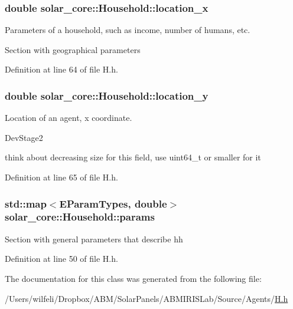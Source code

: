 \subsubsection[{location\+\_\+x}]{\setlength{\rightskip}{0pt plus 5cm}double solar\+\_\+core\+::\+Household\+::location\+\_\+x\hspace{0.3cm}{\ttfamily [protected]}}\label{classsolar__core_1_1_household_a6596375631a366fdd24270f75548841f}
Parameters of a household, such as income, number of humans, etc.

Section with geographical parameters 

Definition at line 64 of file H.\+h.

\hypertarget{classsolar__core_1_1_household_a1ba6b7af82982096e05d99a70a2647eb}{}
\subsubsection[{location\+\_\+y}]{\setlength{\rightskip}{0pt plus 5cm}double solar\+\_\+core\+::\+Household\+::location\+\_\+y\hspace{0.3cm}{\ttfamily [protected]}}\label{classsolar__core_1_1_household_a1ba6b7af82982096e05d99a70a2647eb}
Location of an agent, x coordinate.\begin{DoxyRefDesc}{Dev\+Stage2}
\item[\hyperlink{_dev_stage2__DevStage2000001}{Dev\+Stage2}]think about decreasing size for this field, use uint64\+\_\+t or smaller for it \end{DoxyRefDesc}


Definition at line 65 of file H.\+h.

\hypertarget{classsolar__core_1_1_household_a41d61dc3bab971cb19170341b77d9df8}{}
\subsubsection[{params}]{\setlength{\rightskip}{0pt plus 5cm}std\+::map$<${\bf E\+Param\+Types}, double$>$ solar\+\_\+core\+::\+Household\+::params\hspace{0.3cm}{\ttfamily [protected]}}\label{classsolar__core_1_1_household_a41d61dc3bab971cb19170341b77d9df8}
Section with general parameters that describe hh 

Definition at line 50 of file H.\+h.



The documentation for this class was generated from the following file\+:\begin{DoxyCompactItemize}
\item 
/\+Users/wilfeli/\+Dropbox/\+A\+B\+M/\+Solar\+Panels/\+A\+B\+M\+I\+R\+I\+S\+Lab/\+Source/\+Agents/\hyperlink{_h_8h}{H.\+h}\end{DoxyCompactItemize}
